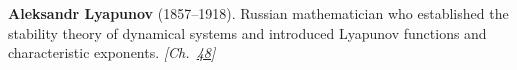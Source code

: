 \textbf{Aleksandr Lyapunov} (1857–1918). Russian mathematician who established the stability theory of dynamical systems and introduced Lyapunov functions and characteristic exponents. \emph{[Ch.~\hyperref[ch:threebody]{48}]}

